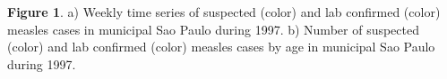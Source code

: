 \textbf{Figure 1}. a) Weekly time series of suspected (color) and lab
confirmed (color) measles cases in municipal Sao Paulo during 1997. b)
Number of suspected (color) and lab confirmed (color) measles cases by
age in municipal Sao Paulo during 1997.
